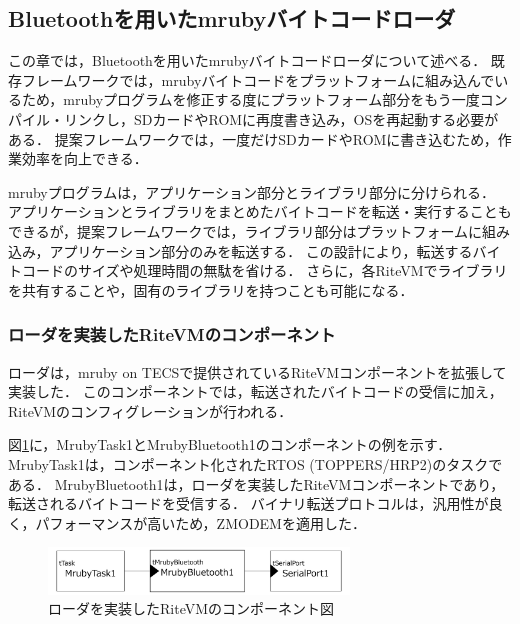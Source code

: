 \documentclass[submit,techrep]{ipsj}
\begin{document}
\subsection{Bluetoothを用いたmrubyバイトコードローダ}
\label{sec:mruby bytecode loader using Bluetooth}
この章では，Bluetoothを用いたmrubyバイトコードローダについて述べる．
既存フレームワークでは，mrubyバイトコードをプラットフォームに組み込んでいるため，mrubyプログラムを修正する度にプラットフォーム部分をもう一度コンパイル・リンクし，SDカードやROMに再度書き込み，OSを再起動する必要がある．
提案フレームワークでは，一度だけSDカードやROMに書き込むため，作業効率を向上できる．

mrubyプログラムは，アプリケーション部分とライブラリ部分に分けられる．
アプリケーションとライブラリをまとめたバイトコードを転送・実行することもできるが，提案フレームワークでは，ライブラリ部分はプラットフォームに組み込み，アプリケーション部分のみを転送する．
この設計により，転送するバイトコードのサイズや処理時間の無駄を省ける．
さらに，各RiteVMでライブラリを共有することや，固有のライブラリを持つことも可能になる．


\subsubsection{ローダを実装したRiteVMのコンポーネント}
ローダは，mruby on TECSで提供されているRiteVMコンポーネント\cite{par:mrubyonTECS}を拡張して実装した．
このコンポーネントでは，転送されたバイトコードの受信に加え，RiteVMのコンフィグレーションが行われる．

図\ref{fig:component_bluetooth}に，MrubyTask1とMrubyBluetooth1のコンポーネントの例を示す．
MrubyTask1は，コンポーネント化されたRTOS (TOPPERS/HRP2)のタスクである．
MrubyBluetooth1は，ローダを実装したRiteVMコンポーネントであり，転送されるバイトコードを受信する．
バイナリ転送プロトコルは，汎用性が良く，パフォーマンスが高いため，ZMODEM\cite{par:ZMODEM}を適用した．

\begin{figure}[t]
    \centering
    \includegraphics[width=8cm,clip]{../EMSOFT2016/figure/component_bluetooth.pdf}
    \vspace{-2mm}
    \caption{ローダを実装したRiteVMのコンポーネント図}
\vspace{-5mm}
    \label{fig:component_bluetooth}
\end{figure}
\end{document}
